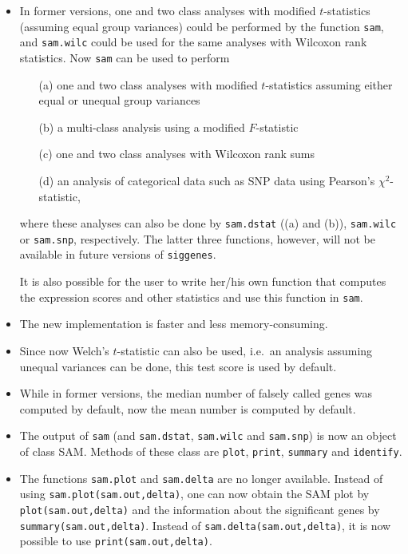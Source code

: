 \documentclass[a4paper]{article}
\begin{document}

\begin{itemize}
\item In former versions, one and two class analyses with modified
$t$-statistics (assuming equal group variances) could be performed by
the function \texttt{sam}, and \texttt{sam.wilc} could be used for the same
analyses with Wilcoxon rank statistics. Now \texttt{sam} can be used to perform
\begin{enumerate}
\item[(a)] one and two class analyses with modified $t$-statistics assuming either
equal or unequal group variances
\item[(b)] a multi-class analysis using a modified $F$-statistic
\item[(c)] one and two class analyses with Wilcoxon rank sums
\item[(d)] an analysis of categorical data such as SNP data using Pearson's $\chi^2$-statistic,
\end{enumerate}

where these analyses can also be done by \texttt{sam.dstat} ((a) and (b)), \texttt{sam.wilc}
or \texttt{sam.snp}, respectively. The latter three functions, however, will not be available
in future versions of \texttt{siggenes}.

It is also possible for the user to write her/his own function that computes the expression
scores and other statistics and use this function in \texttt{sam}.

\item The new implementation is faster and less memory-consuming.

\item Since now Welch's $t$-statistic can also be
used, i.e.\ an analysis assuming unequal variances can be done, this test score is used by
default.

\item While in former versions, the median number of falsely called genes was computed
by default, now the mean number is computed by default.

\item The output of \texttt{sam} (and \texttt{sam.dstat}, \texttt{sam.wilc} and \texttt{sam.snp})
is now an object of class SAM. Methods of these class are \texttt{plot}, \texttt{print},
\texttt{summary} and \texttt{identify}.

\item The functions \texttt{sam.plot} and \texttt{sam.delta} are no longer available.
Instead of using \texttt{sam.plot(sam.out,delta)}, one can now obtain the SAM plot by
\texttt{plot(sam.out,delta)} and the information about the significant genes by
\texttt{summary(sam.out,delta)}. Instead of \texttt{sam.delta(sam.out,delta)}, it is
now possible to use \texttt{print(sam.out,delta)}.


\end{itemize}
\end{document}
